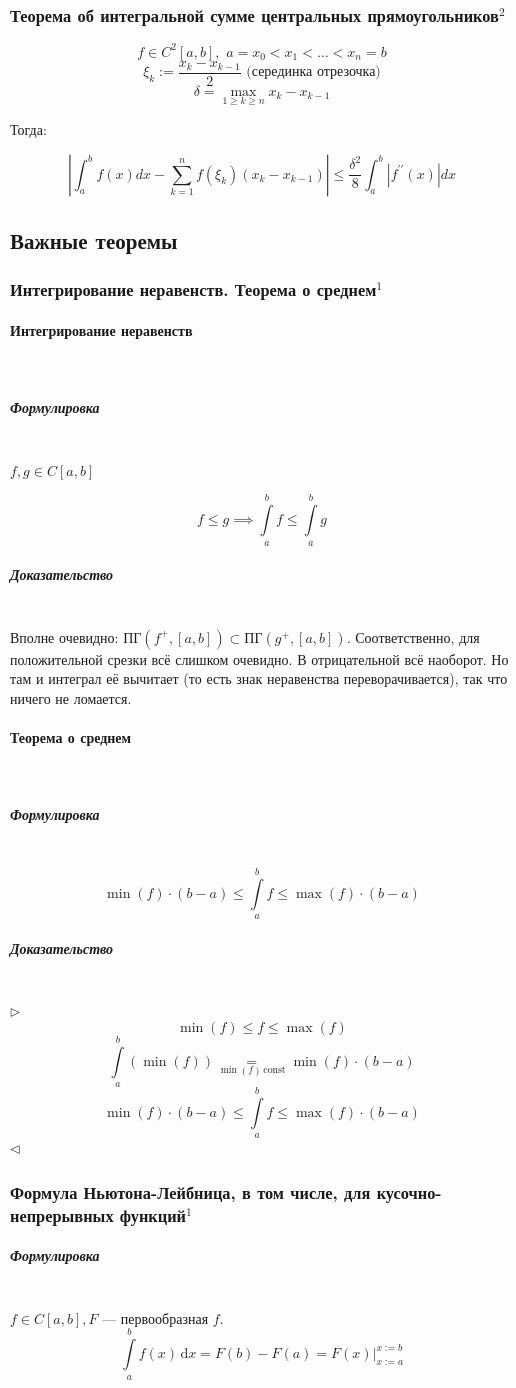 \documentclass{article}
\def\dbl{\,\,}
\def\D{\,\mathrm{d}}
\let\vanillaparagraph\paragraph
\let\vanillasubparagraph\subparagraph
\renewcommand{\paragraph}[1]{\vanillaparagraph{#1}\mbox{}\\}
\renewcommand{\subparagraph}[1]{\vanillasubparagraph{#1}\mbox{}\\}
\begin{document}
\subsubsection{Теорема об интегральной сумме центральных прямоугольников\texorpdfstring{$^2$}{}}

\[f \in C^2[a, b], \dbl a = x_0 < x_1 < \ldots < x_n = b\]
\[\xi_k := \frac{x_k - x_{k - 1}}{2}\text{ (серединка отрезочка)}\] 
\[\delta = \max_{1 \ge k \ge n}{x_k - x_{k - 1}}\]

Тогда:

\[\left|\int_a^b{f(x)dx} - \sum_{k = 1}^n{f(\xi_k)(x_k - x_{k - 1})}\right| \le \frac{\delta^2}{8}\int_a^b{|f^{\prime\prime}(x)|dx}\]

\newpage
\subsection{Важные теоремы}
\subsubsection{Интегрирование неравенств. Теорема о среднем\texorpdfstring{$^1$}{}}
\paragraph{Интегрирование неравенств}
\subparagraph{Формулировка}
$f, g \in C[a, b]$

$$
f \le g \implies \int\limits_a^b f \le \int\limits_a^b g
$$

\subparagraph{Доказательство}
Вполне очевидно: $\text{ПГ}(f^+, [a, b]) \subset \text{ПГ}(g^+, [a, b])$.
Соответственно, для положительной срезки всё слишком очевидно. В отрицательной всё наоборот. Но там и интеграл её вычитает (то есть знак неравенства переворачивается), так что ничего не ломается.


\paragraph{Теорема о среднем}
\subparagraph{Формулировка}
$$
\min(f) \cdot (b - a) \le \int\limits_a^b f \le \max(f) \cdot (b-a)
$$

\subparagraph{Доказательство}
$\rhd$
$$
\min(f) \le f \le \max(f)
$$
$$
\int\limits_a^b(\min(f)) \underset{\min(f) \, \text{const}}{=} \min(f) \cdot (b - a)
$$
$$
\min(f) \cdot (b - a) \le \int\limits_a^b f \le \max(f) \cdot (b-a)
$$
$\lhd$

\subsubsection{Формула Ньютона-Лейбница, в том числе, для кусочно-непрерывных функций\texorpdfstring{$^1$}{}}
\subparagraph{Формулировка}
$f \in C[a, b], F$ --- первообразная $f$. 
$$
\int\limits_a^b f(x)\D x = F(b) - F(a) = F(x)|^{x:=b}_{x:=a}
$$
\end{document}
